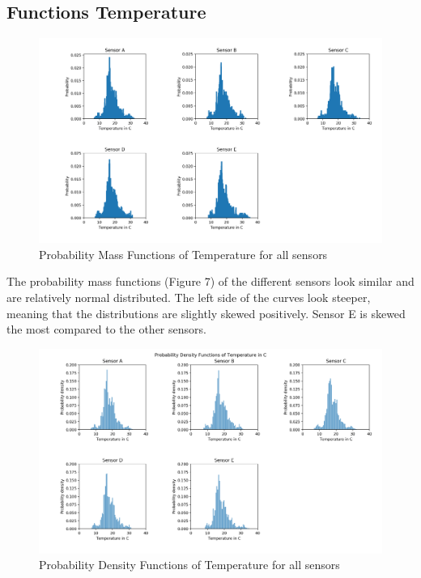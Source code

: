 \documentclass{article}
\begin{document}
        \subsection{Functions Temperature}
            \begin{figure}[H]
                \includegraphics[width=\textwidth]{pmf_temp}
                \caption{Probability Mass Functions of Temperature for all sensors}
            \end{figure}

            The probability mass functions (Figure 7) of the different sensors look similar and are relatively normal
            distributed. The left side of the curves look steeper, meaning that the
            distributions are slightly skewed positively. Sensor E is skewed the most compared
            to the other sensors.

            \begin{figure}[H]
                \includegraphics[width=\textwidth]{pdf_temp}
                \caption{Probability Density Functions of Temperature for all sensors}
            \end{figure}
\end{document}
